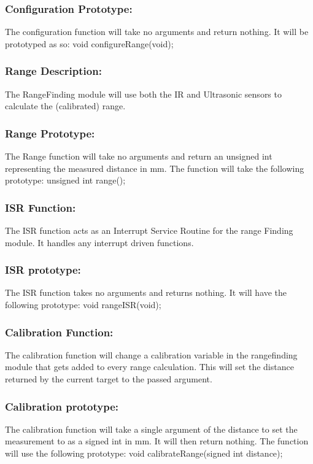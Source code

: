 \documentclass[]{article}
\begin{document}
\subsubsection{Configuration Prototype:}
The configuration function will take no arguments and return nothing. It will be prototyped as so: \newline \newline
void configureRange(void); 

\subsubsection{Range Description:}
The RangeFinding module will use both the IR and Ultrasonic sensors to calculate the (calibrated) range.

\subsubsection{Range Prototype:}
The Range function will take no arguments and return an unsigned int representing the measured distance in mm. The function will take the following prototype: \newline \newline
unsigned int range();

\subsubsection{ISR Function:}
The ISR function acts as an Interrupt Service Routine for the range Finding module. It handles any interrupt driven functions.

\subsubsection{ISR prototype:}
The ISR function takes no arguments and returns nothing. It will have the following prototype: \newline \newline
void rangeISR(void);

\subsubsection{Calibration Function:}
The calibration function will change a calibration variable in the rangefinding module that gets added to every range calculation. This will set the distance returned by the current target to the passed argument.

\subsubsection{Calibration prototype:}
The calibration function will take a single argument of the distance to set the measurement to as a signed int in mm. It will then return nothing. The function will use the following prototype: \newline \newline 
void calibrateRange(signed int distance);
\end{document}
